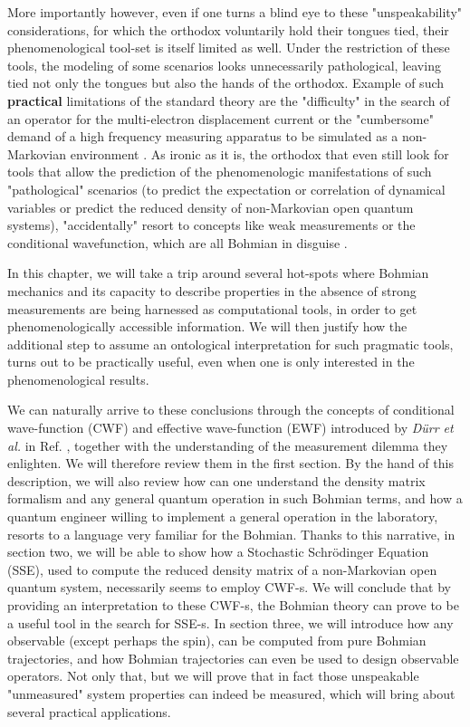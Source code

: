 \documentclass[11pt, a4paper]{article} %
\begin{document}
More importantly however, even if one turns a blind eye to these "unspeakability" considerations, for which the orthodox voluntarily hold their tongues tied, their phenomenological tool-set is itself limited as well. Under the restriction of these tools, the modeling of some scenarios looks unnecessarily pathological, leaving tied not only the tongues but also the hands of the orthodox. Example of such {\bf practical} limitations of the standard theory are the "difficulty" in the search of an operator for the multi-electron displacement current \cite{equiv, Pel} or the "cumbersome" demand of a high frequency measuring apparatus to be simulated as a non-Markovian environment \cite{Thz}. As ironic as it is, the orthodox that even still look for tools that allow the prediction of the phenomenologic manifestations of such "pathological" scenarios (to predict the expectation or correlation of dynamical variables or predict the reduced density of non-Markovian open quantum systems), "accidentally" resort to concepts like weak measurements or the conditional wavefunction, which are all Bohmian in disguise \cite{interpretSSE,NMisModal}.\vspace{-0.1cm}

In this chapter, we will take a trip around several hot-spots where Bohmian mechanics and its capacity to describe properties in the absence of strong measurements are being harnessed as computational tools, in order to get phenomenologically accessible information. We will then justify how the additional step to assume an ontological interpretation for such pragmatic tools, turns out to be practically useful, even when one is only interested in the phenomenological results.


We can naturally arrive to these conclusions through the concepts of conditional wave-function (CWF) and effective wave-function (EWF) introduced by {\em Dürr et al.} in Ref. \cite{Absolute}, together with the understanding of the measurement dilemma they enlighten. We will therefore review them in the first section. By the hand of this description, we will also review how can one understand the density matrix formalism and any general quantum operation in such Bohmian terms, and how a quantum engineer willing to implement a general operation in the laboratory, resorts to a language very familiar for the Bohmian. Thanks to this narrative, in section two, we will be able to show how a Stochastic Schrödinger Equation (SSE), used to compute the reduced density matrix of a non-Markovian open quantum system, necessarily seems to employ CWF-s. We will conclude that by providing an interpretation to these CWF-s, the Bohmian theory can prove to be a useful tool in the search for SSE-s. In section three, we will introduce how any observable (except perhaps the spin), can be computed from pure Bohmian trajectories, and how Bohmian trajectories can even be used to design observable operators. Not only that, but we will prove that in fact those unspeakable "unmeasured" system properties can indeed be measured, which will bring about several practical applications.
\end{document}
